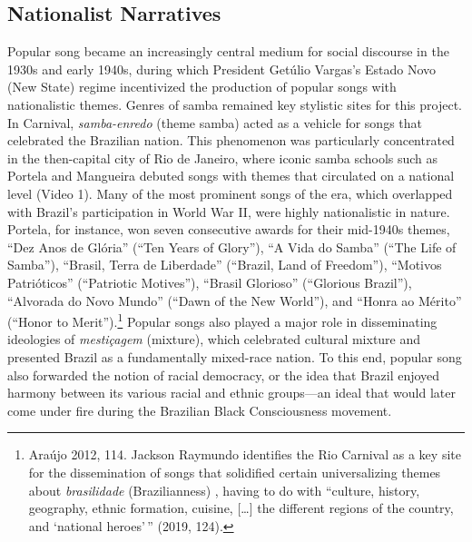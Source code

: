 \documentclass[twoside]{article}
\begin{document}
\hypertarget{nationalist-narratives}{%
\subsection*{Nationalist Narratives}\label{nationalist-narratives}}

Popular song became an increasingly central medium for social discourse
in the 1930s and early 1940s, during which President Getúlio Vargas's
Estado Novo (New State) regime incentivized the production of popular
songs with nationalistic themes. Genres of samba remained key stylistic
sites for this project. In Carnival, \emph{samba-enredo} (theme samba)
acted as a vehicle for songs that celebrated the Brazilian nation. This
phenomenon was particularly concentrated in the then-capital city of Rio
de Janeiro, where iconic samba schools such as Portela and Mangueira
debuted songs with themes that circulated on a national level (Video 1).
Many of the most prominent songs of the era, which overlapped with
Brazil's participation in World War II, were highly nationalistic in
nature. Portela, for instance, won seven consecutive awards for their
mid-1940s themes, ``Dez Anos de Glória'' (``Ten Years of Glory''), ``A
Vida do Samba'' (``The Life of Samba''), ``Brasil, Terra de Liberdade''
(``Brazil, Land of Freedom''), ``Motivos Patrióticos'' (``Patriotic
Motives''), ``Brasil Glorioso'' (``Glorious Brazil''), ``Alvorada do
Novo Mundo'' (``Dawn of the New World''), and ``Honra ao Mérito''
(``Honor to Merit'').\footnote{Araújo 2012, 114. Jackson Raymundo
  identifies the Rio Carnival as a key site for the dissemination of
  songs that solidified certain universalizing themes about
  \emph{brasilidade} (Brazilianness) , having to do with ``culture,
  history, geography, ethnic formation, cuisine, {[}\ldots{]} the
  different regions of the country, and `national heroes'\,'' (2019,
  124).} Popular songs also played a major role in disseminating
ideologies of \emph{mestiçagem} (mixture), which celebrated cultural
mixture and presented Brazil as a fundamentally mixed-race nation. To
this end, popular song also forwarded the notion of racial democracy, or
the idea that Brazil enjoyed harmony between its various racial and
ethnic groups---an ideal that would later come under fire during the
Brazilian Black Consciousness movement.
\end{document}
